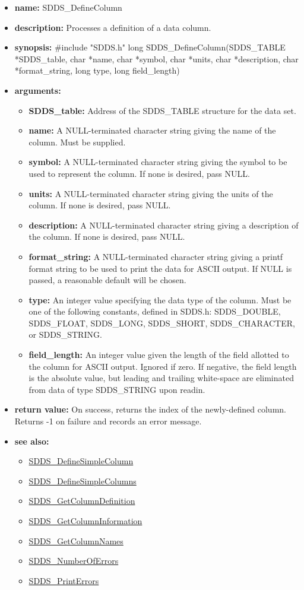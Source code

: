 \documentclass[11pt]{article}
\newcommand{\progref}[1]{\hyperref{SDDS_#1}{{\tt SDDS\_#1} (}{)}{SDDS_#1}}
\begin{document}
\begin{itemize}
\item {\bf name:}\newline
SDDS\_DefineColumn
\item {\bf description:}\newline
Processes a definition of a data column.
\item {\bf synopsis:} \#include "SDDS.h"\newline
long SDDS\_DefineColumn(SDDS\_TABLE *SDDS\_table, char *name, char *symbol, char *units, char *description, char *format\_string, long type, long field\_length)
\item {\bf arguments:}
\begin{itemize}
\item {\bf SDDS\_table:} Address of the SDDS\_TABLE structure for the data set.
\item {\bf name:} A NULL-terminated character string giving the name of the column. Must be supplied.
\item {\bf symbol:} A NULL-terminated character string giving the symbol to be used to represent the column. If none is desired, pass NULL.
\item {\bf units:} A NULL-terminated character string giving the units of the column. If none is desired, pass NULL.
\item {\bf description:} A NULL-terminated character string giving a description of the column. If none is desired, pass NULL.
\item {\bf format\_string:} A NULL-terminated character string giving a  printf format string to be used to print the data for ASCII output. If NULL is passed, a reasonable default will be chosen.
\item {\bf type:} An integer value specifying the data type of the column. Must be one of the following constants, defined in  SDDS.h: SDDS\_DOUBLE, SDDS\_FLOAT, SDDS\_LONG, SDDS\_SHORT, SDDS\_CHARACTER, or SDDS\_STRING.
\item {\bf field\_length:} An integer value given the length of the field allotted to the column for ASCII output. Ignored if zero. If negative, the field length is the absolute value, but leading and trailing white-space are eliminated from data of type SDDS\_STRING upon readin.
\end{itemize}
\item {\bf return value:}\newline
On success, returns the index of the newly-defined column. Returns -1 on failure and records an error message.
\item {\bf see also:}
\begin{itemize}
\item \progref{DefineSimpleColumn}
\item \progref{DefineSimpleColumns}
\item \progref{GetColumnDefinition}
\item \progref{GetColumnInformation}
\item \progref{GetColumnNames}
\item \progref{NumberOfErrors}
\item \progref{PrintErrors}
\end{itemize}
\end{itemize}
\end{document}
